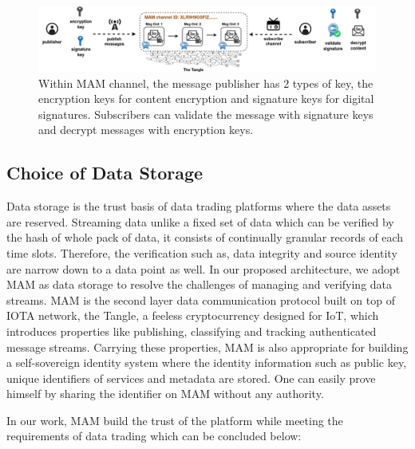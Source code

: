 \documentclass[conference]{IEEEtran}
\begin{document}
\begin{figure}[!t]
    \centering
    \includegraphics[width=\linewidth]{channel_and_key}
    \caption{Within MAM channel, the message publisher has 2 types of key, the encryption keys for content encryption and signature keys for digital signatures. Subscribers can validate the message with signature keys and decrypt messages with encryption keys.}
    \label{fig:channel_and_key}
\end{figure}


\subsection{Choice of Data Storage}
Data storage is the trust basis of data trading platforms where the data assets are reserved. Streaming data unlike a fixed set of data which can be verified by the hash of whole pack of data, it consists of continually granular records of each time slots. Therefore, the verification such as, data integrity and source identity are narrow down to a data point as well. In our proposed architecture, we adopt MAM as data storage to resolve the challenges of managing and verifying data streams. MAM is the second layer data communication protocol built on top of IOTA\cite{IOTAwhitepaper} network, the Tangle, a feeless cryptocurrency designed for IoT, which introduces properties like publishing, classifying and tracking authenticated message streams. Carrying these properties, MAM is also appropriate for building a self-sovereign identity system where the identity information such as public key, unique identifiers of services and metadata are stored. One can easily prove himself by sharing the identifier on MAM without any authority.

In our work, MAM build the trust of the platform while meeting the requirements of data trading which can be concluded below:
\end{document}
